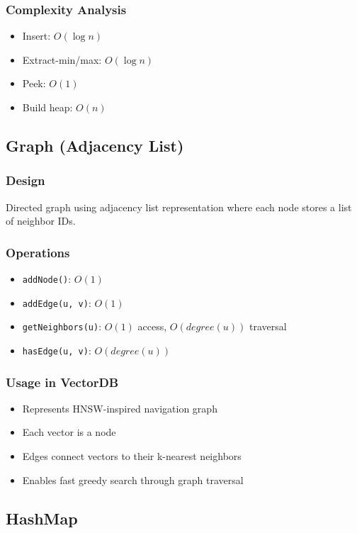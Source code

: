 \documentclass[12pt,a4paper]{article}
\begin{document}
\subsubsection{Complexity Analysis}
\begin{itemize}
    \item Insert: $O(\log n)$
    \item Extract-min/max: $O(\log n)$
    \item Peek: $O(1)$
    \item Build heap: $O(n)$
\end{itemize}

\subsection{Graph (Adjacency List)}

\subsubsection{Design}
Directed graph using adjacency list representation where each node stores a list of neighbor IDs.

\subsubsection{Operations}
\begin{itemize}
    \item \texttt{addNode()}: $O(1)$
    \item \texttt{addEdge(u, v)}: $O(1)$
    \item \texttt{getNeighbors(u)}: $O(1)$ access, $O(degree(u))$ traversal
    \item \texttt{hasEdge(u, v)}: $O(degree(u))$
\end{itemize}

\subsubsection{Usage in VectorDB}
\begin{itemize}
    \item Represents HNSW-inspired navigation graph
    \item Each vector is a node
    \item Edges connect vectors to their k-nearest neighbors
    \item Enables fast greedy search through graph traversal
\end{itemize}

\subsection{HashMap}
\end{document}
